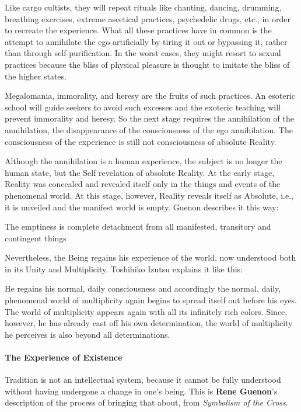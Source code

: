Like cargo cultists, they will repeat rituals like chanting, dancing, drumming, breathing exercises, extreme ascetical practices, psychedelic drugs, etc., in order to recreate the experience. What all these practices have in common is the attempt to annihilate the ego artificially by tiring it out or bypassing it, rather than through self-purification. In the worst cases, they might resort to sexual practices because the bliss of physical pleasure is thought to imitate the bliss of the higher states.

Megalomania, immorality, and heresy are the fruits of such practices. An esoteric school will guide seekers to avoid such excesses and the exoteric teaching will prevent immorality and heresy. So the next stage requires the annihilation of the annihilation, the disappearance of the consciousness of the ego annihilation. The consciousness of the experience is still not consciousness of absolute Reality.

Although the annihilation is a human experience, the subject is no longer the human state, but the Self revelation of absolute Reality. At the early stage, Reality was concealed and revealed itself only in the things and events of the phenomenal world. At this stage, however, Reality reveals itself as Absolute, i.e., it is unveiled and the manifest world is empty. Guenon describes it this way:

\begin{quotex}
The emptiness is complete detachment from all manifested, transitory and contingent things

\end{quotex}
Nevertheless, the Being regains his experience of the world, now understood both in its Unity and Multiplicity. Toshihiko Izutsu explains it like this:

\begin{quotex}
He regains his normal, daily consciousness and accordingly the normal, daily, phenomenal world of multiplicity again begins to spread itself out before his eyes. The world of multiplicity appears again with all its infinitely rich colors. Since, however, he has already cast off his own determination, the world of multiplicity he perceives is also beyond all determinations.

\end{quotex}

\hfill

\paragraph{The Experience of Existence}
Tradition is not an intellectual system, because it cannot be fully understood without having undergone a change in one's being. This is \textbf{Rene Guenon}'s description of the process of bringing that about, from \emph{Symbolism of the Cross}.

